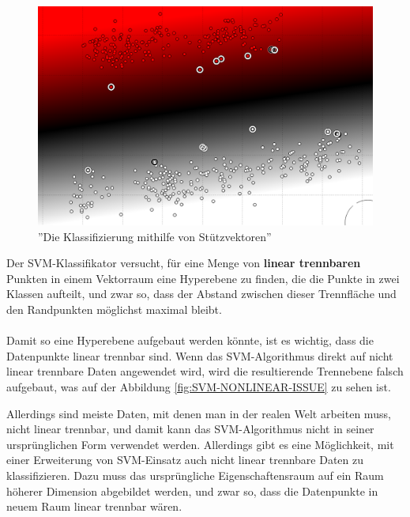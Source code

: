 \begin{figure}
\centering
\includegraphics[width=\textwidth,angle=90]{Bilder/svm-intro.png}
\caption{''Die Klassifizierung mithilfe von Stützvektoren''}
\label{fig:SVM-INTRO}
\end{figure}

Der SVM-Klassifikator versucht, für eine Menge von \textbf{linear trennbaren} Punkten in einem Vektorraum eine Hyperebene zu finden, die die Punkte in zwei Klassen aufteilt, und zwar so, dass der Abstand zwischen dieser Trennfläche und den Randpunkten möglichst maximal bleibt.

\paragraph{}
Damit so eine Hyperebene aufgebaut werden könnte, ist es wichtig, dass die Datenpunkte linear trennbar sind. Wenn das SVM-Algorithmus direkt auf nicht linear trennbare Daten angewendet wird, wird die resultierende Trennebene falsch aufgebaut, was auf der Abbildung \ref{fig:SVM-NONLINEAR-ISSUE} zu sehen ist. 

Allerdings sind meiste Daten, mit denen man in der realen Welt arbeiten muss, nicht linear trennbar, und damit kann das SVM-Algorithmus nicht in seiner ursprünglichen Form verwendet werden. Allerdings gibt es eine Möglichkeit, mit einer Erweiterung von SVM-Einsatz auch nicht linear trennbare Daten zu klassifizieren. Dazu muss das ursprüngliche Eigenschaftensraum auf ein Raum höherer Dimension abgebildet werden, und zwar so, dass die Datenpunkte in neuem Raum linear trennbar wären\cite{Hearst:98}.

